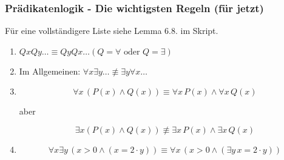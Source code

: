 \documentclass[t,dvipsnames]{beamer}
\begin{document}
\begin{frame}
	\frametitle{Prädikatenlogik - Die wichtigsten Regeln (für jetzt)}
	Für eine vollständigere Liste siehe Lemma 6.8. im Skript.
	\begin{enumerate}
		\item<2-> $Q x Q y \ldots \equiv Q y Q x \ldots (Q = \forall \mbox{ oder } Q = \exists)$
		\item<3-> Im Allgemeinen: $\forall x \exists y \ldots \not \equiv \exists y \forall x \ldots$
		\item<4->
			\begin{equation*}
				\forall x \, \left (P(x) \land Q(x) \right ) \equiv \forall x \, P(x) \land \forall x \, Q(x)
			\end{equation*}
			\begin{center}
				aber
			\end{center}
			\begin{equation*}
				\exists x \left ( P(x) \land Q(x) \right ) \not \equiv \exists x \, P(x) \land \exists x \, Q(x)
			\end{equation*}
		\item<5->
			\begin{equation*}
				\forall x \exists y \, (x > 0 \land (x = 2 \cdot y)) \equiv \forall x \, (x > 0 \land (\exists y \, x = 2 \cdot y))
			\end{equation*}
	\end{enumerate}
\end{frame}
\end{document}
